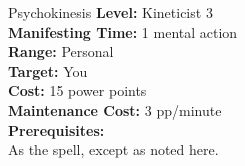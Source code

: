 {Psychokinesis}
{
	\textbf{Level:}
	Kineticist 3\\
	\textbf{Manifesting Time:}
	1 mental action\\
	\textbf{Range:}
	Personal\\
	\textbf{Target:}
	You\\
	\textbf{Cost:}
	15 power points\\
	\textbf{Maintenance Cost:}
	3 pp/minute\\
	\textbf{Prerequisites:}
	\\
}
{
	As the  spell, except as noted here.
}